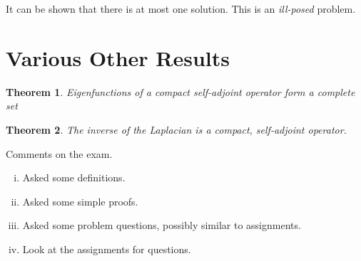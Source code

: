 \documentclass[10pt, oneside, reqno]{amsart}
\theoremstyle{plain}%
\newtheorem{thm}{Theorem}[section]
\numberwithin{equation}{section}
\theoremstyle{definition}
\theoremstyle{remark}
\begin{document}
It can be shown that there is at most one solution.  This is an \emph{ill-posed} problem.





\section{Various Other Results} %
\label{sec:various_other_results}

\begin{thm}
	Eigenfunctions of a compact self-adjoint operator form a complete set 
\end{thm}

\begin{thm}
	The inverse of the Laplacian is a compact, self-adjoint operator.
\end{thm}

Comments on the exam.

\begin{enumerate}[(i)]
	\item Asked some definitions.
	\item Asked some simple proofs.
	\item Asked some problem questions, possibly similar to assignments.
	\item Look at the assignments for questions.
\end{enumerate} 
\end{document}
